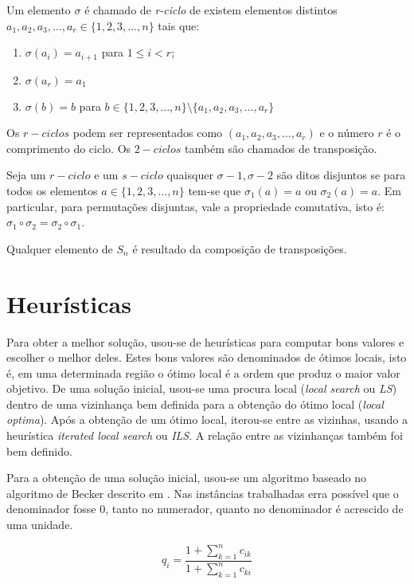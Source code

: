 \documentclass[a4paper,10pt,onecolumn]{article}
\begin{document}
Um elemento $\sigma$ é chamado de \emph{r-ciclo} de existem elementos
distintos $a_1,a_2,a_3,\dots,a_r \in \{1,2,3,\dots, n\}$ tais que:

\begin{enumerate}
\item{$\sigma(a_i) = a_{i+1}$ para $1 \leq i < r$;}
\item{$\sigma(a_r) = a_1$}
\item{$\sigma(b)=b$ para $b \in \{1,2,3,\dots, n\} \setminus
\{a_1,a_2,a_3,\dots,a_r\} $}
\end{enumerate}

Os $r-ciclos$ podem ser representados como $(a_1,a_2,a_3,\dots,a_r)$ e o
número $r$ é o comprimento do ciclo.  Os $2-ciclos$ também são chamados de
transposição.

Seja um $r-ciclo$ e um $s-ciclo$ quaisquer $\sigma-1,\sigma-2$ são ditos
disjuntos se para todos os elementos $a \in \{1,2,3,\dots, n\}$ tem-se que
$\sigma_1(a)=a $ ou $\sigma_2(a)=a$.  Em particular, para permutações
disjuntas, vale a propriedade comutativa, isto é: $\sigma_1 \circ \sigma_2 =
\sigma_2 \circ \sigma_1$.

Qualquer elemento de $S_n$ é resultado da composição de transposições.

\section{Heurísticas}

Para obter a melhor solução, usou-se de heurísticas para computar bons valores
e escolher o melhor deles.  Estes bons valores são denominados de ótimos
locais, isto é, em uma determinada região o ótimo local é a ordem que produz o
maior valor objetivo. De uma solução inicial, usou-se uma procura local
(\emph{local search} ou \emph{LS}) dentro de uma vizinhança bem definida para a obtenção do
ótimo local (\emph{local optima}). Após a obtenção de um ótimo local,
iterou-se entre as vizinhas, usando a heurística \emph{iterated local
  search} ou \emph{ILS}. A relação entre as vizinhanças também foi bem definido.

Para a obtenção de uma solução inicial, usou-se um algoritmo baseado no
algoritmo de 
Becker descrito em \cite{tommaso}.  Nas instâncias trabalhadas erra possível
que o denominador fosse $0$, tanto no numerador, quanto no denominador é
acrescido de uma unidade.

\begin{displaymath}
q_i = \dfrac{1+\sum_{k=1}^nc_{ik}}{1+\sum_{k=1}^nc_{ki}}
\end{displaymath}
\end{document}
